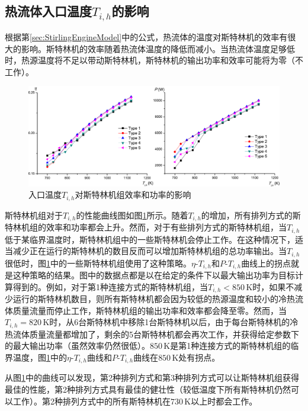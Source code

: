 \subsection{热流体入口温度$T_{i,h}$的影响}
\label{sec:T_i_h}
根据第\ref{sec:StirlingEngineModel}中的公式，热流体的温度对斯特林机的效率有很大的影响。斯特林机的效率随着热流体温度的降低而减小。当热流体温度足够低时，热源温度将不足以带动斯特林机，斯特林机的输出功率和效率可能将为零（不工作）。
\begin{figure}[htpb]
\begin{center}
	\includegraphics[width = 0.95\columnwidth]{fig/T_ih}
	\caption{入口温度$T_{i,h}$对斯特林机组效率和功率的影响}
	\label{fig:Ti_h}
\end{center}
\end{figure}
斯特林机组对于$T_{i,h}$的性能曲线图如图\ref{fig:Ti_h}所示。随着$T_{i,h}$的增加，所有排列方式的斯特林机组的效率和功率都会上升。然而，对于有些排列方式的斯特林机组，当$T_{i,h}$低于某临界温度时，斯特林机组中的一些斯特林机会停止工作。在这种情况下，适当减少正在运行的斯特林机的数目反而可以增加斯特林机组的总功率输出。当$T_{i,h}$很低时，图\ref{fig:Ti_h}中的一些斯特林机组使用了这种策略。$\eta$-$T_{i,h}$和$P$-$T_{i,h}$曲线上的拐点就是这种策略的结果。图中的数据点都是以在给定的条件下以最大输出功率为目标计算得到的。例如，对于第1种连接方式的斯特林机组，当$T_{i,h} < 850\,\mathrm{K}$时，如果不减少运行的斯特林机数目，则所有斯特林机都会因为较低的热源温度和较小的冷热流体质量流量而停止工作，斯特林机组的输出功率和效率都会降至零。然而，当$T_{i,h} = 820\,\mathrm{K}$时，从6台斯特林机中移除1台斯特林机以后，由于每台斯特林机的冷热流体质量流量都增加了，剩余的5台斯特林机都会再次工作，并获得给定参数下的最大输出功率（虽然效率仍然很低）。$850\,\mathrm{K}$是第1种连接方式的斯特林机组的临界温度，图\ref{fig:Ti_h}中的$\eta$-$T_{i,h}$曲线和$P$-$T_{i,h}$曲线在$850\,\mathrm{K}$处有拐点。

从图\ref{fig:Ti_h}中的曲线可以发现，第2种排列方式和第3种排列方式可以让斯特林机组获得最佳的性能，第2种排列方式具有最佳的健壮性（较低温度下所有斯特林机仍然可以工作）。第2种排列方式中的所有斯特林机在$730\,\mathrm{K}$以上时都会工作。

